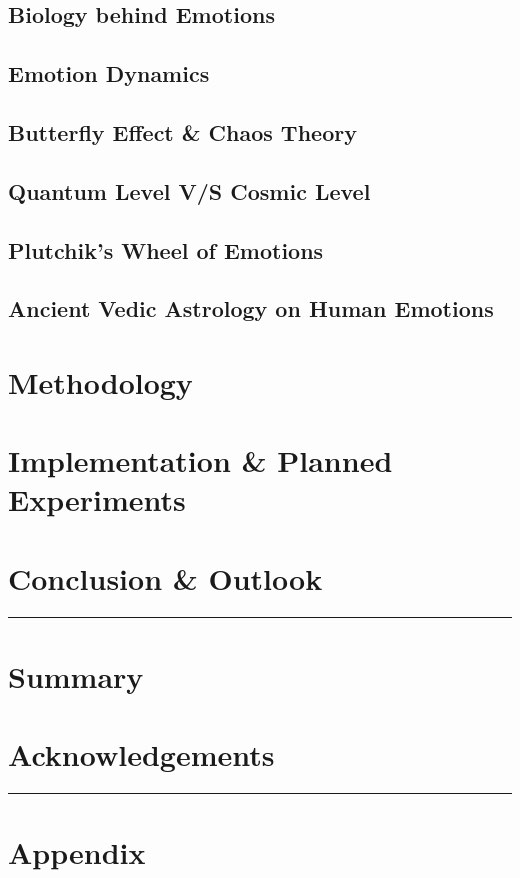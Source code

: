 \documentclass[12pt, a4paper]{article}
\begin{document}
\begin{multicols}{2}
		\subsection{Biology behind Emotions}
		\subsection{Emotion Dynamics}
		
		\subsection{Butterfly Effect \& Chaos Theory}
		
		\subsection{Quantum Level V/S Cosmic Level}
		
		\subsection{Plutchik's Wheel of Emotions}
		
		\subsection{Ancient Vedic Astrology on Human Emotions}
		
		\section{Methodology}
		
		\section{Implementation \& Planned Experiments}
		
		\section{Conclusion \& Outlook}
		
	\end{multicols}
	\hrule
	\centering
	\section*{Summary}
	
	\section*{Acknowledgements}
	
	\newline
	\hrule
	
	
	\appendix
	\section*{Appendix}
	
\end{document}

